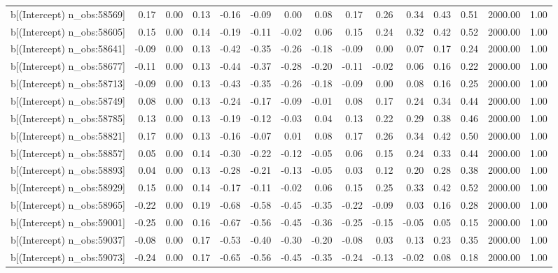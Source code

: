 \begin{table}[ht]
\begin{tabular}{rrrrrrrrrrrrrrr}
  b[(Intercept) n\_obs:58569] & 0.17 & 0.00 & 0.13 & -0.16 & -0.09 & 0.00 & 0.08 & 0.17 & 0.26 & 0.34 & 0.43 & 0.51 & 2000.00 & 1.00 \\ 
  b[(Intercept) n\_obs:58605] & 0.15 & 0.00 & 0.14 & -0.19 & -0.11 & -0.02 & 0.06 & 0.15 & 0.24 & 0.32 & 0.42 & 0.52 & 2000.00 & 1.00 \\ 
  b[(Intercept) n\_obs:58641] & -0.09 & 0.00 & 0.13 & -0.42 & -0.35 & -0.26 & -0.18 & -0.09 & 0.00 & 0.07 & 0.17 & 0.24 & 2000.00 & 1.00 \\ 
  b[(Intercept) n\_obs:58677] & -0.11 & 0.00 & 0.13 & -0.44 & -0.37 & -0.28 & -0.20 & -0.11 & -0.02 & 0.06 & 0.16 & 0.22 & 2000.00 & 1.00 \\ 
  b[(Intercept) n\_obs:58713] & -0.09 & 0.00 & 0.13 & -0.43 & -0.35 & -0.26 & -0.18 & -0.09 & 0.00 & 0.08 & 0.16 & 0.25 & 2000.00 & 1.00 \\ 
  b[(Intercept) n\_obs:58749] & 0.08 & 0.00 & 0.13 & -0.24 & -0.17 & -0.09 & -0.01 & 0.08 & 0.17 & 0.24 & 0.34 & 0.44 & 2000.00 & 1.00 \\ 
  b[(Intercept) n\_obs:58785] & 0.13 & 0.00 & 0.13 & -0.19 & -0.12 & -0.03 & 0.04 & 0.13 & 0.22 & 0.29 & 0.38 & 0.46 & 2000.00 & 1.00 \\ 
  b[(Intercept) n\_obs:58821] & 0.17 & 0.00 & 0.13 & -0.16 & -0.07 & 0.01 & 0.08 & 0.17 & 0.26 & 0.34 & 0.42 & 0.50 & 2000.00 & 1.00 \\ 
  b[(Intercept) n\_obs:58857] & 0.05 & 0.00 & 0.14 & -0.30 & -0.22 & -0.12 & -0.05 & 0.06 & 0.15 & 0.24 & 0.33 & 0.44 & 2000.00 & 1.00 \\ 
  b[(Intercept) n\_obs:58893] & 0.04 & 0.00 & 0.13 & -0.28 & -0.21 & -0.13 & -0.05 & 0.03 & 0.12 & 0.20 & 0.28 & 0.38 & 2000.00 & 1.00 \\ 
  b[(Intercept) n\_obs:58929] & 0.15 & 0.00 & 0.14 & -0.17 & -0.11 & -0.02 & 0.06 & 0.15 & 0.25 & 0.33 & 0.42 & 0.52 & 2000.00 & 1.00 \\ 
  b[(Intercept) n\_obs:58965] & -0.22 & 0.00 & 0.19 & -0.68 & -0.58 & -0.45 & -0.35 & -0.22 & -0.09 & 0.03 & 0.16 & 0.28 & 2000.00 & 1.00 \\ 
  b[(Intercept) n\_obs:59001] & -0.25 & 0.00 & 0.16 & -0.67 & -0.56 & -0.45 & -0.36 & -0.25 & -0.15 & -0.05 & 0.05 & 0.15 & 2000.00 & 1.00 \\ 
  b[(Intercept) n\_obs:59037] & -0.08 & 0.00 & 0.17 & -0.53 & -0.40 & -0.30 & -0.20 & -0.08 & 0.03 & 0.13 & 0.23 & 0.35 & 2000.00 & 1.00 \\ 
  b[(Intercept) n\_obs:59073] & -0.24 & 0.00 & 0.17 & -0.65 & -0.56 & -0.45 & -0.35 & -0.24 & -0.13 & -0.02 & 0.08 & 0.18 & 2000.00 & 1.00 \\ 

\end{tabular}
\end{table}
